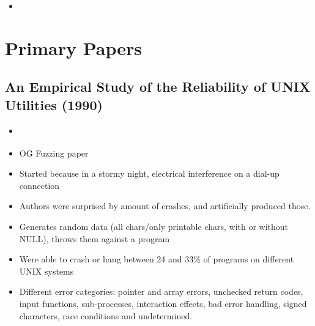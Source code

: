 \documentclass{article}
\begin{document}
\begin{itemize}
  \item {}\cite{EvaluatingFuzzTesting}
\end{itemize}

\pagebreak
\section{Primary Papers}
\subsection{An Empirical Study of the Reliability of UNIX Utilities (1990)}
\begin{itemize}
  \item \cite{UNIX}
  \item OG Fuzzing paper
  \item Started because in a stormy night, electrical interference on a dial-up connection
  \item Authors were surprised by amount of crashes, and artificially produced those.
  \item Generates random data (all chars/only printable chars, with or without NULL), throws them against a program
  \item Were able to crash or hang between 24 and 33\% of programs on different UNIX systems
  \item Different error categories: pointer and array errors, unchecked return codes, input functions, sub-processes, interaction effects, bad error handling, signed characters, race conditions and undetermined.
\end{itemize}
\end{document}

